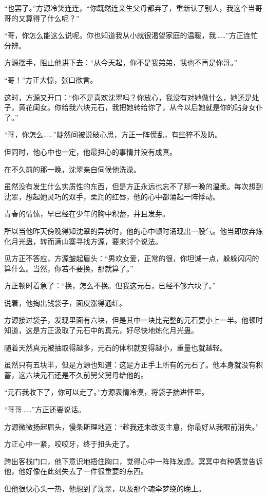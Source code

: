 \begin{this_body}
“也罢了。”方源冷笑连连，“你既然连亲生父母都弃了，重新认了别人，我这个当哥哥的又算得了什么呢？”

“哥，你怎么能这么说呢。你也知道我从小就很渴望家庭的温暖，我……”方正连忙分辨。

方源摆手，阻止他讲下去：“从今天起，你不是我弟弟，我也不再是你哥。”

“哥！”方正大惊，张口欲言。

这时，方源又开口：“你不是喜欢沈翠吗？你放心，我没有对她做什么，她还是处子，黄花闺女。你给我六块元石，我把她转给你了，从今以后她就是你的贴身女仆了。”

“哥，你怎么……”陡然间被说破心思，方正一阵慌乱，有些猝不及防。

但同时，他心中也一定，他最担心的事情并没有成真。

在不久前的那一晚，沈翠亲自伺候他洗澡。

虽然没有发生什么实质性的东西，但是方正永远也忘不了那一晚的温柔。每次想到沈翠，想起她灵巧的双手，柔润的红唇，他的心中都涌起一阵悸动。

青春的情愫，早已经在少年的胸中积蓄，并且发芽。

所以当他昨天傍晚得知沈翠的异状时，他的心中顿时涌现出一股气。他当即放弃炼化月光蛊，转而满山寨寻找方源，要来讨个说法。

见方正不答应，方源皱起眉头：“男欢女爱，正常的很，你坦诚一点，躲躲闪闪的算什么。当然，你若不要换，那就算了。”

方正顿时着急了：“换，怎么不换。但我这元石，已经不够六块了。”

说着，他掏出钱袋子，面皮涨得通红。

方源接过袋子，发现里面有六块，但是其中一块比完整的元石要小上一半。他顿时知道，这是方正汲取了元石中的真元，好尽快地炼化月光蛊。

随着天然真元被抽取得越多，元石的体积就变得越小，重量也就越轻。

虽然只有五块半，但是方源也知道：这是方正手上所有的元石了。他本身就没有积蓄，这六块元石还是不久前舅父舅母给他的。

“元石我收下了，你可以走了。”方源表情冷漠，将袋子揣进怀里。

“哥哥……”方正还要说话。

方源微微扬起眉头，慢条斯理地道：“趁我还未改变主意，你最好从我眼前消失。”

方正心中一紧，咬咬牙，终于扭头走了。

跨出客栈门口，他下意识地捂住胸口，觉得心中一阵阵发虚。冥冥中有种感觉告诉他，他好像在此刻失去了一件很重要的东西。

但他很快心头一热，他想到了沈翠，以及那个魂牵梦绕的晚上。


\end{this_body}
